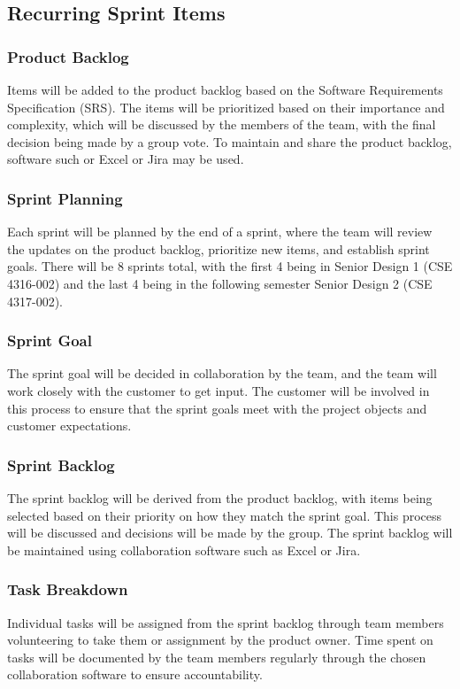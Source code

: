 \subsection{Recurring Sprint Items}

\subsubsection{Product Backlog}
Items will be added to the product backlog based on the Software Requirements Specification (SRS). The items will be prioritized based on their importance and complexity, which will be discussed by the members of the team, with the final decision being made by a group vote. To maintain and share the product backlog, software such or Excel or Jira may be used.

\subsubsection{Sprint Planning}
Each sprint will be planned by the end of a sprint, where the team will review the updates on the product backlog, prioritize new items, and establish sprint goals. There will be 8 sprints total, with the first 4 being in Senior Design 1 (CSE 4316-002) and the last 4 being in the following semester Senior Design 2 (CSE 4317-002).

\subsubsection{Sprint Goal}
The sprint goal will be decided in collaboration by the team, and the team will work closely with the customer to get input. The customer will be involved in this process to ensure that the sprint goals meet with the project objects and customer expectations.

\subsubsection{Sprint Backlog}
The sprint backlog will be derived from the product backlog, with items being selected based on their priority on how they match the sprint goal. This process will be discussed and decisions will be made by the group. The sprint backlog will be maintained using collaboration software such as Excel or Jira.

\subsubsection{Task Breakdown}
Individual tasks will be assigned from the sprint backlog through team members volunteering to take them or assignment by the product owner. Time spent on tasks will be documented by the team members regularly through the chosen collaboration software to ensure accountability.

